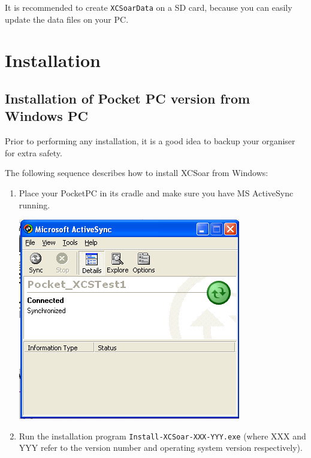 \documentclass[a4paper,12pt]{refrep}
\begin{document}
It is recommended to create \texttt{XCSoarData} on a SD card, because
you can easily update the data files on your PC.


\section{Installation}
\subsection*{Installation of Pocket PC version from Windows PC}

Prior to performing any installation, it is a good idea to backup your
organiser for extra safety.

The following sequence describes how to install XCSoar from Windows:
\begin{enumerate}
\item Place your PocketPC in its cradle and make sure
 you have MS ActiveSync running.
\begin{center}
\includegraphics[angle=0,width=\linewidth,keepaspectratio='true']{figures/XCS_ActiveSync.png}
\end{center}

\item Run the installation program \verb|Install-XCSoar-XXX-YYY.exe| 
  (where XXX and YYY refer to the version number and operating system
  version respectively).


\end{enumerate}
\end{document}
